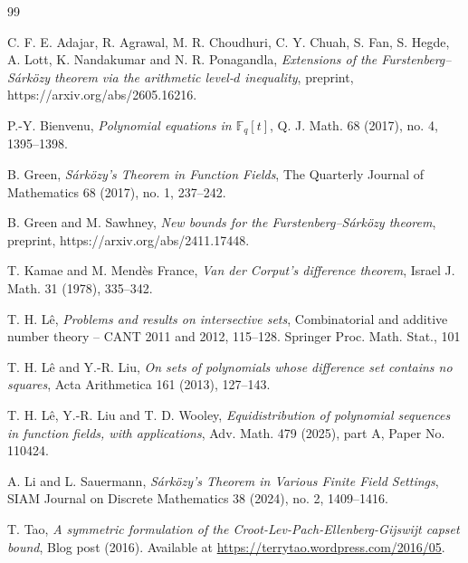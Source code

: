 \documentclass[11pt]{amsart}
\newcommand\Fq{{\mathbb{F}_q}}
\theoremstyle{definition}
\theoremstyle{remark}
\begin{document}
\begin{thebibliography}{99}

C. F. E. Adajar, R. Agrawal, M. R. Choudhuri, C. Y. Chuah, S. Fan, S. Hegde, A. Lott, K. Nandakumar and N. R. Ponagandla,
\emph{Extensions of the Furstenberg--S\'ark\"ozy theorem via the arithmetic level-$d$ inequality}, preprint, https://arxiv.org/abs/2605.16216.



P.-Y. Bienvenu, \emph{Polynomial equations in $\Fq[t]$}, Q. J. Math. 68 (2017), no. 4, 1395--1398.

B. Green, \emph{S\'ark\"ozy's Theorem in Function Fields}, The Quarterly Journal of Mathematics 68 (2017), no. 1, 237--242.

B. Green and M. Sawhney, \emph{New bounds for the Furstenberg--S\'ark\"ozy theorem}, preprint, https://arxiv.org/abs/2411.17448.

T. Kamae and M. Mend\`{e}s France, \emph{Van der Corput's difference
theorem}, Israel J. Math. 31 (1978), 335--342.

T. H. L\^e, \emph{Problems and results on intersective sets}, Combinatorial and additive number theory -- CANT 2011 and 2012, 115--128. Springer Proc. Math. Stat., 101

T. H. L\^e and Y.-R. Liu, \emph{On sets of polynomials whose difference set contains no squares}, Acta Arithmetica 161 (2013), 127--143. 

T. H. L\^e, Y.-R. Liu and T. D. Wooley, \emph{Equidistribution of polynomial sequences in function fields, with applications}, Adv. Math. 479 (2025), part A, Paper No. 110424.

A. Li and L. Sauermann, \emph{S\'ark\"ozy's Theorem in Various Finite Field Settings}, SIAM Journal on Discrete Mathematics 38 (2024), no. 2, 1409--1416. 


T. Tao, \emph{A symmetric formulation of the Croot-Lev-Pach-Ellenberg-Gijswijt capset bound}, Blog post (2016). Available at \url{https://terrytao.wordpress.com/2016/05}.


\end{thebibliography}
\end{document}
